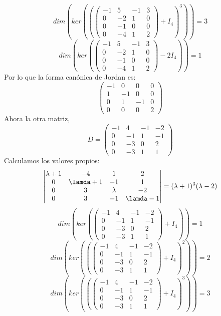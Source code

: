 \documentclass{article}
\begin{document}
$$
dim\left( ker\left(\left(\left(\begin{matrix}
-1 & 5 & -1 & 3 \\
0 & -2 & 1 & 0 \\
0 & -1 & 0 & 0 \\
0 & -4 & 1 & 2
\end{matrix}\right)+I_4\right)^3\right)\right)=3
$$
$$
dim\left(ker\left(\left(\begin{matrix}
-1 & 5 & -1 & 3 \\
0 & -2 & 1 & 0 \\
0 & -1 & 0 & 0 \\
0 & -4 & 1 & 2
\end{matrix}\right)-2 I_4\right)\right)=1
$$
Por lo que la forma canónica de Jordan es:
$$
\left(\begin{matrix}
-1 & 0 & 0 & 0 \\
1 & -1 & 0 & 0 \\
0 & 1 & -1 & 0 \\
0 & 0 & 0 & 2
\end{matrix}\right)
$$
Ahora la otra matriz,
$$
D=
\left(\begin{matrix}
-1 & 4 & -1 & -2 \\
0 & -1 & 1 & -1 \\
0 & -3 & 0 & 2 \\
0 & -3 & 1 & 1
\end{matrix}\right)
$$
Calculamos los valores propios:
$$
\left|\begin{matrix}
\lambda+1 & -4 & 1 & 2 \\
0 & \lamda+1 & -1 & 1 \\
0 & 3 & \lambda & -2 \\
0 & 3 & -1 & \lamda-1
\end{matrix}\right|
= (\lambda+1)^3(\lambda-2)
$$
$$
dim\left(ker\left(\left(\begin{matrix}
-1 & 4 & -1 & -2 \\
0 & -1 & 1 & -1 \\
0 & -3 & 0 & 2 \\
0 & -3 & 1 & 1
\end{matrix}\right)+I_4\right)\right)=1
$$
$$
dim\left( ker\left(\left(\left(\begin{matrix}
-1 & 4 & -1 & -2 \\
0 & -1 & 1 & -1 \\
0 & -3 & 0 & 2 \\
0 & -3 & 1 & 1
\end{matrix}\right)+I_4\right)^2\right)\right)=2
$$
$$
dim\left( ker\left(\left(\left(\begin{matrix}
-1 & 4 & -1 & -2 \\
0 & -1 & 1 & -1 \\
0 & -3 & 0 & 2 \\
0 & -3 & 1 & 1
\end{matrix}\right)+I_4\right)^3\right)\right)=3
$$
\end{document}
